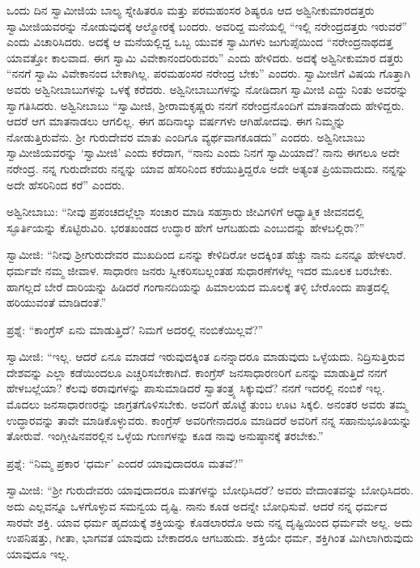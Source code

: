  ಒಂದು ದಿನ ಸ್ವಾಮೀಜಿಯ ಬಾಲ್ಯ ಸ್ನೇಹಿತರೂ ಮತ್ತು ಪರಮಹಂಸರ ಶಿಷ್ಯರೂ ಆದ ಅಶ್ವಿನೀಕುಮಾರದತ್ತರು ಸ್ವಾಮೀಜಿಯವರನ್ನು ನೋಡುವುದಕ್ಕೆ ಆಲ್ಮೋರಕ್ಕೆ ಬಂದರು. ಅವರಿದ್ದ ಮನೆಯಲ್ಲಿ “ಇಲ್ಲಿ ನರೇಂದ್ರದತ್ತರು ಇರುವರೆ” ಎಂದು ವಿಚಾರಿಸಿದರು. ಅದಕ್ಕೆ ಆ ಮನೆಯಲ್ಲಿದ್ದ ಒಬ್ಬ ಯುವಕ ಸ್ವಾಮಿಗಳು ಜುಗುಪ್ಸೆಯಿಂದ “ನರೇಂದ್ರನಾಥದತ್ತ ಯಾವತ್ತೋ ಕಾಲವಾದ. ಈಗ ಸ್ವಾಮಿ ವಿವೇಕಾನಂದರಿರುವರು” ಎಂದು ಹೇಳಿದರು. ಅದಕ್ಕೆ ಅಶ್ವಿನೀಕುಮಾರ ದತ್ತರು “ನನಗೆ ಸ್ವಾಮಿ ವಿವೇಕಾನಂದ ಬೇಕಾಗಿಲ್ಲ. ಪರಮಹಂಸರ ನರೇಂದ್ರ ಬೇಕು” ಎಂದರು. ಸ್ವಾಮೀಜಿಗೆ ವಿಷಯ ಗೊತ್ತಾಗಿ ಅವರು ಅಶ್ವಿನೀಬಾಬುಗಳನ್ನು ಒಳಕ್ಕೆ ಕರೆದರು. ಅಶ್ವಿನೀಬಾಬುಗಳನ್ನು ನೋಡಿದಾಗ ಸ್ವಾಮೀಜಿ ಎದ್ದು ನಿಂತು ಅವರನ್ನು ಸ್ವಾಗತಿಸಿದರು. ಅಶ್ವಿನೀಬಾಬು “ಸ್ವಾಮೀಜಿ, ಶ‍್ರೀರಾಮಕೃಷ್ಣರು ನನಗೆ ನರೇಂದ್ರನೊಂದಿಗೆ ಮಾತನಾಡೆಂದು ಹೇಳಿದ್ದರು. ಆದರೆ ಆಗ ಮಾತನಾಡಲು ಆಗಲಿಲ್ಲ. ಈಗ ಹದಿನಾಲ್ಕು ವರ್ಷಗಳು ಆಗಿಹೋದವು. ಈಗ ನಿಮ್ಮನ್ನು ನೋಡುತ್ತಿರುವೆನು. ಶ‍್ರೀ ಗುರುದೇವರ ಮಾತು ಎಂದಿಗೂ ವ್ಯರ್ಥವಾಗಕೂಡದು” ಎಂದರು. ಅಶ್ವಿನೀಬಾಬು ಸ್ವಾಮೀಜಿಯವರನ್ನು ‘ಸ್ವಾಮೀಜಿ’ ಎಂದು ಕರೆದಾಗ, “ನಾನು ಎಂದು ನಿನಗೆ ಸ್ವಾಮಿಯಾದೆ? ನಾನು ಈಗಲೂ ಅದೇ ನರೇಂದ್ರ. ನನ್ನ ಗುರುದೇವರು ನನ್ನನ್ನು ಯಾವ ಹೆಸರಿನಿಂದ ಕರೆಯುತ್ತಿದ್ದರೊ ಅದೇ ಅತ್ಯಂತ ಪ್ರಿಯವಾದುದು. ನನ್ನನ್ನು ಅದೇ ಹೆಸರಿನಿಂದ ಕರೆ” ಎಂದರು. 

 ಅಶ್ವಿನೀಬಾಬು: “ನೀವು ಪ್ರಪಂಚದಲ್ಲೆಲ್ಲಾ ಸಂಚಾರ ಮಾಡಿ ಸಹಸ್ರಾರು ಜೀವಿಗಳಿಗೆ ಆಧ್ಯಾತ್ಮಿಕ ಜೀವನದಲ್ಲಿ ಸ್ಫೂರ್ತಿಯನ್ನು ಕೊಟ್ಟಿರುವಿರಿ. ಭರತಖಂಡದ ಉದ್ಧಾರ ಹೇಗೆ ಆಗಬಹುದು ಎಂಬುದನ್ನು ಹೇಳಬಲ್ಲಿರಾ?” 

 ಸ್ವಾಮೀಜಿ: “ನೀವು ಶ‍್ರೀಗುರುದೇವರ ಮುಖದಿಂದ ಏನನ್ನು ಕೇಳಿದಿರೋ ಅದಕ್ಕಿಂತ ಹೆಚ್ಚು ನಾನು ಏನನ್ನೂ ಹೇಳಲಾರೆ. ಧರ್ಮವೇ ನಮ್ಮ ಜೀವಾಳ. ಸಾಧಾರಣ ಜನರು ಸ್ವೀಕರಿಸಬಲ್ಲಂತಹ ಸುಧಾರಣೆಗಳೆಲ್ಲ ಇದರ ಮೂಲಕ ಬರಬೇಕು. ಹಾಗಲ್ಲದೆ ಬೇರೆ ದಾರಿಯನ್ನು ಹಿಡಿದರೆ ಗಂಗಾನದಿಯನ್ನು ಹಿಮಾಲಯದ ಮೂಲಕ್ಕೆ ತಳ್ಳಿ ಬೇರೊಂದು ಪಾತ್ರದಲ್ಲಿ ಹರಿಯುವಂತೆ ಮಾಡಿದಂತೆ.” 

\vskip 2pt

 ಪ್ರಶ್ನೆ: “ಕಾಂಗ್ರೆಸ್ ಏನು ಮಾಡುತ್ತಿದೆ? ನಿಮಗೆ ಅದರಲ್ಲಿ ನಂಬಿಕೆಯಿಲ್ಲವೆ?” 

\vskip 2pt

 ಸ್ವಾಮೀಜಿ: “ಇಲ್ಲ. ಆದರೆ ಏನೂ ಮಾಡದೆ ಇರುವುದಕ್ಕಿಂತ ಏನನ್ನಾದರೂ‌ ಮಾಡುವುದು ಒಳ್ಳೆಯದು. ನಿದ್ರಿಸುತ್ತಿರುವ ದೇಶವನ್ನು ಎಲ್ಲಾ ಕಡೆಯಿಂದಲೂ ಎಚ್ಚರಿಸಬೇಕಾಗಿದೆ. ಕಾಂಗ್ರೆಸ್ ಜನಸಾಧಾರಣರಿಗೆ ಏನನ್ನು ಮಾಡುತ್ತಿದೆ ನನಗೆ ಹೇಳಬಲ್ಲೆಯಾ? ಕೆಲವು ಠರಾವುಗಳನ್ನು ಪಾಸುಮಾಡಿದರೆ ಸ್ವಾತಂತ್ರ್ಯ ಸಿಕ್ಕುವುದೆ? ನನಗೆ ಇದರಲ್ಲಿ ನಂಬಿಕೆ ಇಲ್ಲ. ಮೊದಲು ಜನಸಾಧಾರಣರನ್ನು ಜಾಗ್ರತಗೊಳಿಸಬೇಕು. ಅವರಿಗೆ ಹೊಟ್ಟೆ ತುಂಬ ಊಟ ಸಿಕ್ಕಲಿ. ಅನಂತರ ಅವರು ತಮ್ಮ ಉದ್ಧಾರವನ್ನು ತಾವೇ ಮಾಡಿಕೊಳ್ಳುವರು. ಕಾಂಗ್ರೆಸ್ ಅವರಿಗೇನಾದರೂ ಮಾಡಿದರೆ ಅವರಿಗೆ ನನ್ನ ಸಹಾನುಭೂತಿಯನ್ನು ತೋರುವೆ. ಇಂಗ್ಲೀಷಿನವರಲ್ಲಿನ ಒಳ್ಳೆಯ ಗುಣಗಳನ್ನು ಕೂಡ ನಾವು ಅನುಷ್ಠಾನಕ್ಕೆ ತರಬೇಕು.” 

\vskip 2pt

 ಪ್ರಶ್ನೆ: “ನಿಮ್ಮ ಪ್ರಕಾರ ‘ಧರ್ಮ’ ಎಂದರೆ ಯಾವುದಾದರೂ ಮತವೆ?” 

\vskip 2pt

 ಸ್ವಾಮೀಜಿ: “ಶ‍್ರೀ ಗುರುದೇವರು ಯಾವುದಾದರೂ ಮತಗಳನ್ನು ಬೋಧಿಸಿದರೆ? ಅವರು ವೇದಾಂತವನ್ನು ಬೋಧಿಸಿದರು. ಅದು ಎಲ್ಲವನ್ನೂ ಒಳಗೊಳ್ಳುವ ಸಮನ್ವಯ ದೃಷ್ಟಿ. ನಾನು ಕೂಡ ಅದನ್ನೇ ಬೋಧಿಸುವೆ. ಆದರೆ ನನ್ನ ಧರ್ಮದ ಸಾರವೇ ಶಕ್ತಿ. ಯಾವ ಧರ್ಮ ಹೃದಯಕ್ಕೆ ಶಕ್ತಿಯನ್ನು ಕೊಡಲಾರದೊ ಅದು ನನ್ನ ದೃಷ್ಟಿಯಿಂದ ಧರ್ಮವೇ ಅಲ್ಲ. ಅದು ಉಪನಿಷತ್ತು, ಗೀತಾ, ಭಾಗವತ ಯಾವುದು ಬೇಕಾದರೂ ಆಗಬಹುದು. ಶಕ್ತಿಯೇ ಧರ್ಮ, ಶಕ್ತಿಗಿಂತ ಮಿಗಿಲಾಗಿರುವುದು ಯಾವುದೂ ಇಲ್ಲ. 

